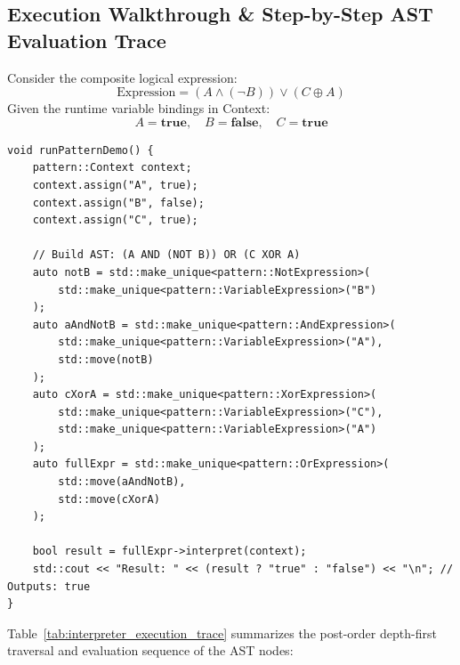 \documentclass[12pt,a4paper]{article}
\begin{document}
\newpage
\subsection{Execution Walkthrough \& Step-by-Step AST Evaluation Trace}

Consider the composite logical expression:
\begin{equation}
\text{Expression} = (A \land (\neg B)) \lor (C \oplus A)
\end{equation}
Given the runtime variable bindings in Context:
\begin{equation*}
A = \mathbf{true}, \quad B = \mathbf{false}, \quad C = \mathbf{true}
\end{equation*}

\begin{lstlisting}[caption=Building and Evaluating the AST]
void runPatternDemo() {
    pattern::Context context;
    context.assign("A", true);
    context.assign("B", false);
    context.assign("C", true);

    // Build AST: (A AND (NOT B)) OR (C XOR A)
    auto notB = std::make_unique<pattern::NotExpression>(
        std::make_unique<pattern::VariableExpression>("B")
    );
    auto aAndNotB = std::make_unique<pattern::AndExpression>(
        std::make_unique<pattern::VariableExpression>("A"),
        std::move(notB)
    );
    auto cXorA = std::make_unique<pattern::XorExpression>(
        std::make_unique<pattern::VariableExpression>("C"),
        std::make_unique<pattern::VariableExpression>("A")
    );
    auto fullExpr = std::make_unique<pattern::OrExpression>(
        std::move(aAndNotB),
        std::move(cXorA)
    );

    bool result = fullExpr->interpret(context);
    std::cout << "Result: " << (result ? "true" : "false") << "\n"; // Outputs: true
}
\end{lstlisting}

Table~\ref{tab:interpreter_execution_trace} summarizes the post-order depth-first traversal and evaluation sequence of the AST nodes:
\end{document}
